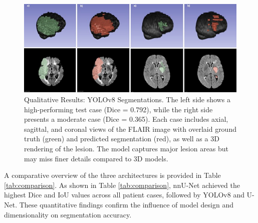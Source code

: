 \documentclass[12pt]{article}
\begin{document}
\begin{figure}[tp]
    \centering
    \includegraphics[width=\textwidth]{figures/Figure 6.jpg}
    \caption{Qualitative Results: YOLOv8 Segmentations. The left side shows a high-performing test case (Dice = 0.792), while the right side presents a moderate case (Dice = 0.365). Each case includes axial, sagittal, and coronal views of the FLAIR image with overlaid ground truth (green) and predicted segmentation (red), as well as a 3D rendering of the lesion. The model captures major lesion areas but may miss finer details compared to 3D models.}
    \label{fig:yolov8_qualitative}
\end{figure}



A comparative overview of the three architectures is provided in Table \ref{tab:comparison}. As shown in Table \ref{tab:comparison}, nnU-Net achieved the highest Dice and IoU values across all patient cases, followed by YOLOv8 and U-Net. These quantitative findings confirm the influence of model design and dimensionality on segmentation accuracy.

\begin{table}[tp]
\centering
{}
\caption{Comparison of segmentation models on the test set (N=25). The nnU-Net achieved the highest Dice and IoU scores, indicating superior segmentation accuracy and robustness. YOLOv8 provided competitive performance with efficient inference, while U-Net showed limited generalization capabilities.}
\label{tab:comparison}
\end{table}
\end{document}
